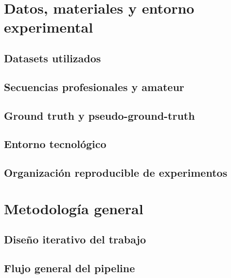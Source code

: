 \documentclass[12pt, a4paper, twoside]{article}
\begin{document}
	\newpage
	
	
	\section{Datos, materiales y entorno experimental}
	
	\subsection{Datasets utilizados}
	\subsection{Secuencias profesionales y amateur}
	\subsection{Ground truth y pseudo-ground-truth}
	\subsection{Entorno tecnológico}
	\subsection{Organización reproducible de experimentos}
	
	\newpage
	
	
	\section{Metodología general}
	
	\subsection{Diseño iterativo del trabajo}
	\subsection{Flujo general del pipeline}
\end{document}
